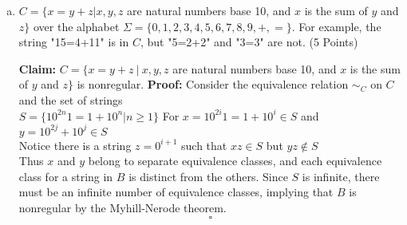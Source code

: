 \documentclass{article}
\begin{document}
\begin{enumerate}[(a)]
\item $C = \{x=y+z | x,y,z$ are natural numbers base 10, and $x$ is the sum of $y$ and $z\}$
    over the alphabet $\Sigma = \{0,1,2,3,4,5,6,7,8,9,+,=\}$. For example, the string
    "15=4+11" is in $C$, but "5=2+2" and "3=3" are not. (5 Points)

\textbf{Claim:}
    $C = \{x=y+z\ |\ x,y,z$ are natural numbers base 10, and $x$ is the sum of $y$ and $z\}$
    is nonregular.
\textbf{Proof:}
    Consider the equivalence relation $\sim_C$ on $C$ and the set of strings \\
    $S = \{ 10^{2n}1 = 1+10^n | n \geq 1\}$
    For $x = 10^{2i}1 = 1 + 10^i \in S$ and $y = 10^{2j} + 10^j \in S$ \\
    Notice there is a string $z = 0^{i+1}$ such that $xz \in S$ but $yz \notin S$ \\
    Thus $x$ and $y$ belong to separate equivalence classes,
    and each equivalence class for a string in
    $B$ is distinct from the others. Since $S$ is infinite, there must be an infinite number of
    equivalence classes, implying that $B$ is nonregular by the Myhill-Nerode theorem.
    \[ \square \]


\end{enumerate}

\newpage
\end{document}
